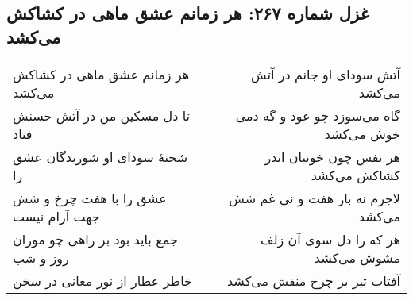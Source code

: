 \begin{center}
\section*{غزل شماره ۲۶۷: هر زمانم عشق ماهی در کشاکش می‌کشد}
\label{sec:267}
\begin{longtable}{l p{0.5cm} r}
هر زمانم عشق ماهی در کشاکش می‌کشد
&&
آتش سودای او جانم در آتش می‌کشد
\\
تا دل مسکین من در آتش حسنش فتاد
&&
گاه می‌سوزد چو عود و گه دمی خوش می‌کشد
\\
شحنهٔ سودای او شوریدگان عشق را
&&
هر نفس چون خونیان اندر کشاکش می‌کشد
\\
عشق را با هفت چرخ و شش جهت آرام نیست
&&
لاجرم نه بار هفت و نی غم شش می‌کشد
\\
جمع باید بود بر راهی چو موران روز و شب
&&
هر که را دل سوی آن زلف مشوش می‌کشد
\\
خاطر عطار از نور معانی در سخن
&&
آفتاب تیر بر چرخ منقش می‌کشد
\\
\end{longtable}
\end{center}
